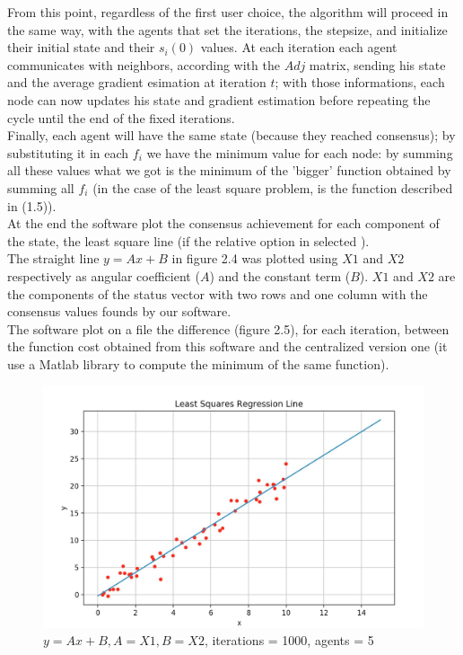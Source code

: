 \documentclass[a4paper,11pt,oneside]{book}
\begin{document}
{{From this point, regardless of the first user choice, the algorithm will proceed in the same way, with the agents that set the iterations, the stepsize, and initialize their initial state and their $s_{i}(0)$ values. At each iteration each agent communicates with neighbors, according  with the $Adj$ matrix, sending his state and the average gradient esimation at iteration $t$; with those informations, each node can now updates his state and gradient estimation before repeating the cycle until the end of the fixed iterations.
\\ Finally, each agent will have the same state (because they reached consensus); by substituting it in each $f_{i}$ we have the minimum value for each node: by summing all these values what we got is the minimum of the 'bigger' function obtained by summing all $f_{i}$ (in the case of the least square problem, is the function described in (1.5)).
\\ At the end the software plot the consensus achievement for each component of the state, the least square line (if the relative option in selected ).
\\The straight line $y = Ax + B$ in figure 2.4 was plotted using $X1$ and $X2$ respectively as angular coefficient ($A$) and the constant term ($B$). $X1$ and $X2$ are the components of the status vector with two rows and one column with the consensus values founds by our software.
\\The software plot on a file the difference (figure 2.5), for each iteration, between the function cost obtained from this software and the centralized version one (it use a Matlab library to compute the minimum of the same function).



\begin{figure}[H]
 \centering
 \includegraphics[width=14.5 cm]{figure5.jpg}
 \caption{$y = Ax + B, A = X1 , B = X2$, iterations = 1000, agents = 5}
 

\end{figure}}}
\end{document}
